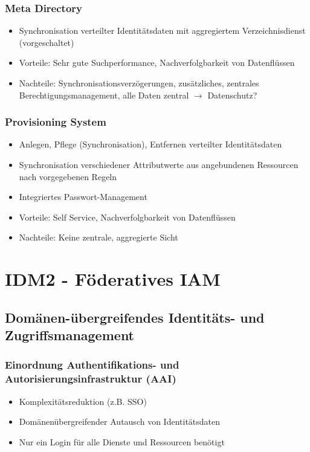 \subsubsection{Meta Directory}
\begin{itemize}
	\item Synchronisation verteilter Identitätsdaten mit aggregiertem Verzeichnisdienst (vorgeschaltet)
	\item Vorteile: Sehr gute Suchperformance, Nachverfolgbarkeit von Datenflüssen
	\item Nachteile: Synchronisationsverzögerungen, zusätzliches, zentrales Berechtigungsmanagement, alle Daten zentral $\rightarrow$ Datenschutz?
\end{itemize}

\subsubsection{Provisioning System}
\begin{itemize}
	\item Anlegen, Pflege (Synchronisation), Entfernen verteilter Identitätsdaten
	\item Synchronisation verschiedener Attributwerte aus angebundenen Ressourcen nach vorgegebenen Regeln
	\item Integriertes Passwort-Management
	\item Vorteile: Self Service, Nachverfolgbarkeit von Datenflüssen
	\item Nachteile: Keine zentrale, aggregierte Sicht
\end{itemize}



\section{IDM2 - Föderatives IAM}

\subsection{Domänen-übergreifendes Identitäts- und Zugriffsmanagement}

\subsubsection{Einordnung Authentifikations- und Autorisierungsinfrastruktur (AAI)}
\begin{itemize}
	\item Komplexitätsreduktion (z.B. SSO)
	\item Domänenübergreifender Autausch von Identitätsdaten
	\item Nur ein Login für alle Dienste und Ressourcen benötigt
\end{itemize}

